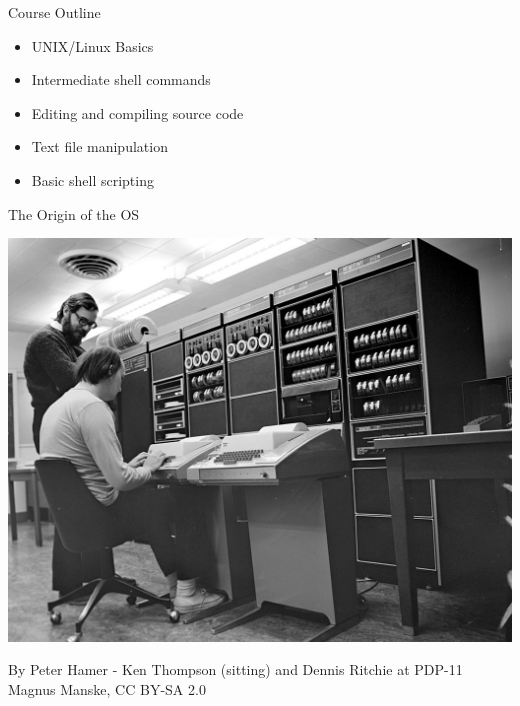 \documentclass[unknownkeysallowed, 10pt, a4 paper, handout]{beamer}
\begin{document}
\begin{frame}[label=outline]{Course Outline}
  \begin{itemize}
    \item UNIX/Linux Basics
    \item Intermediate shell commands
    \item Editing and compiling source code
    \item Text file manipulation
    \item Basic shell scripting
  \end{itemize}
\end{frame}


\begin{frame}[label=pdp11]{The Origin of the OS}
  \begin{center}
    \includegraphics[scale=3.5]{pics/pdp11.jpg}
  \end{center}
  \begin{flushright}
    \tiny{By Peter Hamer - Ken Thompson (sitting) and Dennis Ritchie at
    PDP-11 Magnus Manske, CC BY-SA 2.0}
  \end{flushright}
\end{frame}
\end{document}
